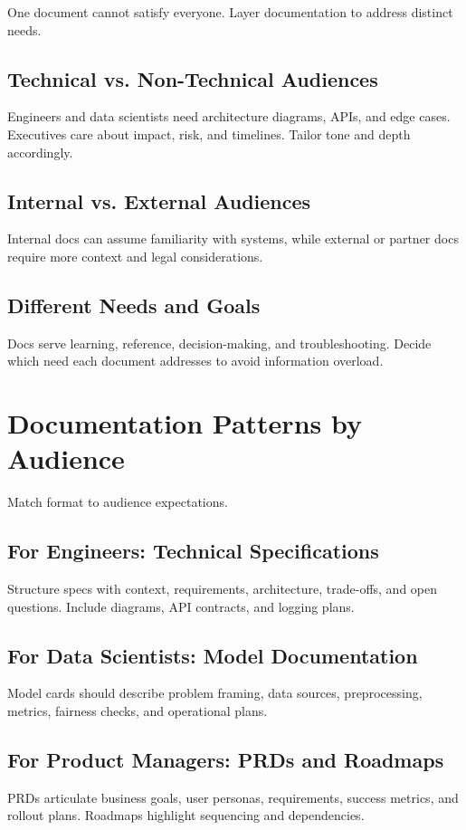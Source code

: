 One document cannot satisfy everyone. Layer documentation to address distinct needs.

\subsection{Technical vs. Non-Technical Audiences}
Engineers and data scientists need architecture diagrams, APIs, and edge cases. Executives care about impact, risk, and timelines. Tailor tone and depth accordingly.

\subsection{Internal vs. External Audiences}
Internal docs can assume familiarity with systems, while external or partner docs require more context and legal considerations.

\subsection{Different Needs and Goals}
Docs serve learning, reference, decision-making, and troubleshooting. Decide which need each document addresses to avoid information overload.

\section{Documentation Patterns by Audience}
\label{sec:patterns-by-audience}

Match format to audience expectations.

\subsection{For Engineers: Technical Specifications}
Structure specs with context, requirements, architecture, trade-offs, and open questions. Include diagrams, API contracts, and logging plans.

\subsection{For Data Scientists: Model Documentation}
Model cards should describe problem framing, data sources, preprocessing, metrics, fairness checks, and operational plans.

\subsection{For Product Managers: PRDs and Roadmaps}
PRDs articulate business goals, user personas, requirements, success metrics, and rollout plans. Roadmaps highlight sequencing and dependencies.

